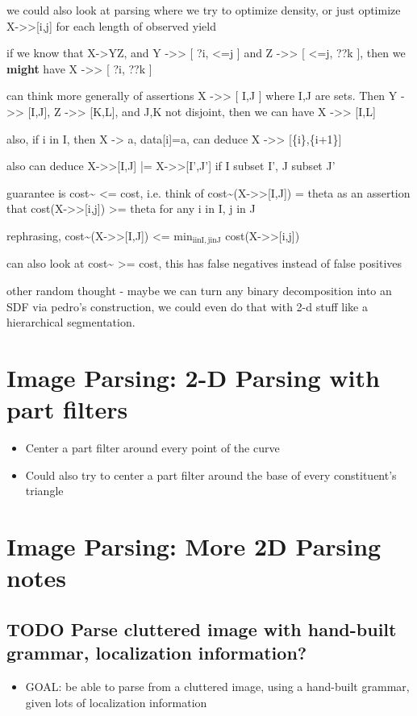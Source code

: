 \documentclass{book}
\begin{document}
we could also look at parsing where we try to optimize density, or
just optimize X->>[i,j] for each length of observed yield

if we know that X->YZ, and
Y ->> [ ?i, <=j ] and Z ->> [ <=j, ??k ], then we \textbf{might} have X ->> [ ?i, ??k ]

can think more generally of assertions X ->> [ I,J ] where I,J are
sets. Then Y ->> [I,J], Z ->> [K,L], and J,K not disjoint, then we can have X ->> [I,L]

also, if i in I, then X -> a, data[i]=a, can deduce X ->> [\{i\},\{i+1\}]

also can deduce X->>[I,J] |= X->>[I',J'] if I subset I', J subset J'

guarantee is cost\~{} <= cost, i.e.
think of cost\~{}(X->>[I,J]) = theta as an assertion that cost(X->>[i,j]) >= theta for any i in I, j in J

rephrasing, cost\~{}(X->>[I,J]) <= min$_{\mathrm{i in I, j in J}}$ cost(X->>[i,j])

can also look at cost\~{} >= cost, this has false negatives instead of false positives

other random thought - maybe we can turn any binary decomposition into
an SDF via pedro's construction, we could even do that with 2-d stuff
like a hierarchical segmentation.
\section{Image Parsing: 2-D Parsing with part filters}
\label{sec-5_28}

\begin{itemize}
\item Center a part filter around every point of the curve
\item Could also try to center a part filter around the base of every
    constituent's triangle
\end{itemize}
\section{Image Parsing: More 2D Parsing notes}
\label{sec-5_29}
\subsection{\textbf{TODO} Parse cluttered image with hand-built grammar, localization information?}
\label{sec-5_29_1}

\begin{itemize}
\item GOAL: be able to parse from a cluttered image, using a hand-built
    grammar, given lots of localization information
\end{itemize}
\end{document}
